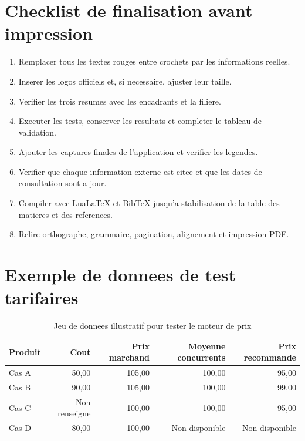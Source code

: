 \documentclass[12pt,a4paper,oneside]{report}
\begin{document}
\chapter{Checklist de finalisation avant impression}
\begin{enumerate}
  \item Remplacer tous les textes rouges entre crochets par les informations reelles.
  \item Inserer les logos officiels et, si necessaire, ajuster leur taille.
  \item Verifier les trois resumes avec les encadrants et la filiere.
  \item Executer les tests, conserver les resultats et completer le tableau de validation.
  \item Ajouter les captures finales de l'application et verifier les legendes.
  \item Verifier que chaque information externe est citee et que les dates de consultation sont a jour.
  \item Compiler avec LuaLaTeX et BibTeX jusqu'a stabilisation de la table des matieres et des references.
  \item Relire orthographe, grammaire, pagination, alignement et impression PDF.
\end{enumerate}

\chapter{Exemple de donnees de test tarifaires}
\begin{table}[H]
\centering
\caption{Jeu de donnees illustratif pour tester le moteur de prix}
\begin{tabular}{lrrrr}
\toprule
Produit & Cout & Prix marchand & Moyenne concurrents & Prix recommande \\
\midrule
Cas A & 50,00 & 105,00 & 100,00 & 95,00 \\
Cas B & 90,00 & 105,00 & 100,00 & 99,00 \\
Cas C & Non renseigne & 100,00 & 100,00 & 95,00 \\
Cas D & 80,00 & 100,00 & Non disponible & Non disponible \\
\bottomrule
\end{tabular}
\end{table}
\end{document}
